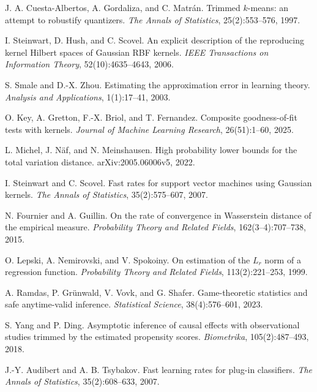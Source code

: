 J. A. Cuesta-Albertos, A. Gordaliza, and C. Matr{\'a}n.
\newblock Trimmed $k$-means: an attempt to robustify quantizers.
\newblock \emph{The Annals of Statistics}, 25(2):553--576, 1997.

I. Steinwart, D. Hush, and C. Scovel.
\newblock An explicit description of the reproducing kernel {H}ilbert spaces of {G}aussian {RBF} kernels.
\newblock \emph{IEEE Transactions on Information Theory}, 52(10):4635--4643, 2006.

S. Smale and D.-X. Zhou.
\newblock Estimating the approximation error in learning theory.
\newblock \emph{Analysis and Applications}, 1(1):17--41, 2003.

O. Key, A. Gretton, F.-X. Briol, and T. Fernandez.
\newblock Composite goodness-of-fit tests with kernels.
\newblock \emph{Journal of Machine Learning Research}, 26(51):1--60, 2025.

L. Michel, J. N{\"a}f, and N. Meinshausen.
\newblock High probability lower bounds for the total variation distance.
\newblock arXiv:2005.06006v5, 2022.

I. Steinwart and C. Scovel.
\newblock Fast rates for support vector machines using {G}aussian kernels.
\newblock \emph{The Annals of Statistics}, 35(2):575--607, 2007.

N. Fournier and A. Guillin.
\newblock On the rate of convergence in {W}asserstein distance of the empirical measure.
\newblock \emph{Probability Theory and Related Fields}, 162(3--4):707--738, 2015.

O. Lepski, A. Nemirovski, and V. Spokoiny.
\newblock On estimation of the {$L_r$} norm of a regression function.
\newblock \emph{Probability Theory and Related Fields}, 113(2):221--253, 1999.

A. Ramdas, P. Gr{\"u}nwald, V. Vovk, and G. Shafer.
\newblock Game-theoretic statistics and safe anytime-valid inference.
\newblock \emph{Statistical Science}, 38(4):576--601, 2023.

S. Yang and P. Ding.
\newblock Asymptotic inference of causal effects with observational studies trimmed by the estimated propensity scores.
\newblock \emph{Biometrika}, 105(2):487--493, 2018.

J.-Y. Audibert and A. B. Tsybakov.
\newblock Fast learning rates for plug-in classifiers.
\newblock \emph{The Annals of Statistics}, 35(2):608--633, 2007.

